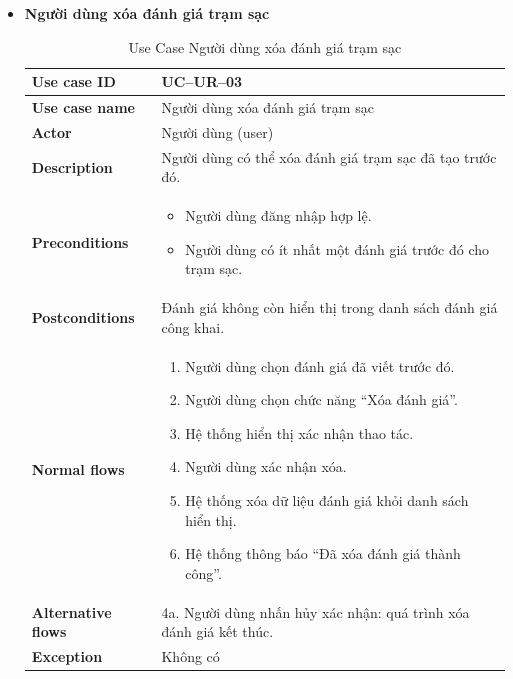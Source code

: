 \begin{itemize}
\item \textbf{Người dùng xóa đánh giá trạm sạc}
\begin{longtable}{|m{}|m{}|}
          \caption{Use Case Người dùng xóa đánh giá trạm sạc} \\
  \hline
  \textbf{Use case ID} & UC--UR--03 \\
  \hline
  \textbf{Use case name} & Người dùng xóa đánh giá trạm sạc \\
  \hline
  \textbf{Actor} & Người dùng (user) \\
  \hline
  \textbf{Description} & Người dùng có thể xóa đánh giá trạm sạc đã tạo trước đó. \\
  \hline
  \textbf{Preconditions} &
  \begin{itemize}
    \item Người dùng đăng nhập hợp lệ.
    \item Người dùng có ít nhất một đánh giá trước đó cho trạm sạc.
  \end{itemize}\\
  \hline
  \textbf{Postconditions} & Đánh giá không còn hiển thị trong danh sách đánh giá công khai. \\
  \hline
  \textbf{Normal flows} &
  \begin{enumerate}[label=\arabic*.]
    \item Người dùng chọn đánh giá đã viết trước đó.
    \item Người dùng chọn chức năng “Xóa đánh giá”.
    \item Hệ thống hiển thị xác nhận thao tác.
    \item Người dùng xác nhận xóa.
    \item Hệ thống xóa dữ liệu đánh giá khỏi danh sách hiển thị.
    \item Hệ thống thông báo “Đã xóa đánh giá thành công”.
  \end{enumerate}\\
  \hline
  \textbf{Alternative flows} &
  4a. Người dùng nhấn hủy xác nhận: quá trình xóa đánh giá kết thúc.\\
  \hline
  \textbf{Exception} & Không có\\
  \hline
  \end{longtable}


\end{itemize}
